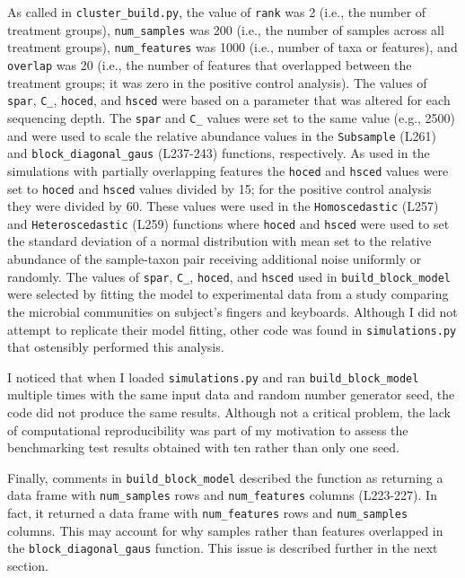 \documentclass[
]{article}
\begin{document}
As called in \texttt{cluster\_build.py}, the value of \texttt{rank} was
2 (i.e., the number of treatment groups), \texttt{num\_samples} was 200
(i.e., the number of samples across all treatment groups),
\texttt{num\_features} was 1000 (i.e., number of taxa or features), and
\texttt{overlap} was 20 (i.e., the number of features that overlapped
between the treatment groups; it was zero in the positive control
analysis). The values of \texttt{spar}, \texttt{C\_}, \texttt{hoced},
and \texttt{hsced} were based on a parameter that was altered for each
sequencing depth. The \texttt{spar} and \texttt{C\_} values were set to
the same value (e.g., 2500) and were used to scale the relative
abundance values in the \texttt{Subsample} (L261) and
\texttt{block\_diagonal\_gaus} (L237-243) functions, respectively. As
used in the simulations with partially overlapping features the
\texttt{hoced} and \texttt{hsced} values were set to \texttt{hoced} and
\texttt{hsced} values divided by 15; for the positive control analysis
they were divided by 60. These values were used in the
\texttt{Homoscedastic} (L257) and \texttt{Heteroscedastic} (L259)
functions where \texttt{hoced} and \texttt{hsced} were used to set the
standard deviation of a normal distribution with mean set to the
relative abundance of the sample-taxon pair receiving additional noise
uniformly or randomly. The values of \texttt{spar}, \texttt{C\_},
\texttt{hoced}, and \texttt{hsced} used in \texttt{build\_block\_model}
were selected by fitting the model to experimental data from a study
comparing the microbial communities on subject's fingers and keyboards.
Although I did not attempt to replicate their model fitting, other code
was found in \texttt{simulations.py} that ostensibly performed this
analysis.

I noticed that when I loaded \texttt{simulations.py} and ran
\texttt{build\_block\_model} multiple times with the same input data and
random number generator seed, the code did not produce the same results.
Although not a critical problem, the lack of computational
reproducibility was part of my motivation to assess the benchmarking
test results obtained with ten rather than only one seed.

Finally, comments in \texttt{build\_block\_model} described the function
as returning a data frame with \texttt{num\_samples} rows and
\texttt{num\_features} columns (L223-227). In fact, it returned a data
frame with \texttt{num\_features} rows and \texttt{num\_samples}
columns. This may account for why samples rather than features
overlapped in the \texttt{block\_diagonal\_gaus} function. This issue is
described further in the next section.
\end{document}
